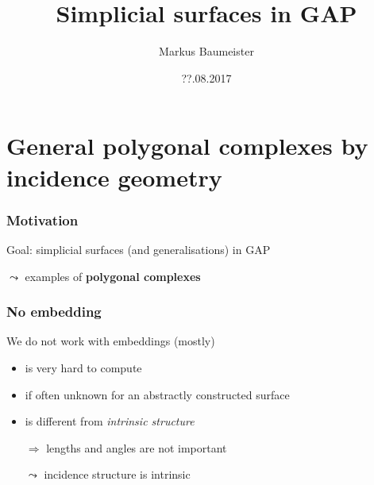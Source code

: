 \documentclass[11pt, handout]{beamer}
\author{Markus Baumeister}
\title{Simplicial surfaces in GAP}
\date{??.08.2017}
\begin{document}
\begin{frame}
\titlepage
\end{frame}


\begin{frame}
    \tableofcontents
\end{frame}


\section{General polygonal complexes by incidence geometry}
\frame{\tableofcontents[currentsection]}

\begin{frame}
    \frametitle{Motivation}
    \pause
    Goal: simplicial surfaces (and generalisations) in GAP
    \pause
    \begin{center}
        
    \end{center}
    \pause
    $\leadsto$ examples of \textbf{polygonal complexes}
\end{frame}

\begin{frame}
    \frametitle{No embedding}
    \pause
    We do not work with embeddings (mostly)
    \begin{itemize}
        \pause
        \item is very hard to compute %
        \pause
        \item if often unknown for an abstractly constructed surface
        \pause
        \item is different from \textit{intrinsic structure}
        \pause
        \item[$\Rightarrow$] lengths and angles are not important
        \pause
        \item[$\leadsto$] incidence structure is intrinsic
    \end{itemize}
\end{frame}
\end{document}
